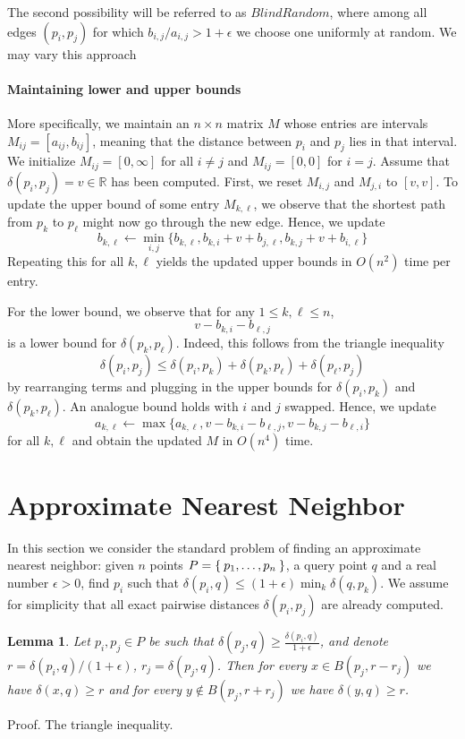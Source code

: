 \documentclass[10pt]{article}
\newcommand{\R}{\mathbb{R}}
\newcommand{\eps}{\epsilon}
\newcommand{\dist}{\delta}
\newtheorem{lemma}[theorem]{Lemma}
\begin{document}
The second possibility will be referred to as $BlindRandom$, where among all edges $(p_i, p_j)$
for which $b_{i,j} / a_{i,j} > 1 + \eps$ we choose one uniformly at random. We may vary this approach




 \paragraph{Maintaining lower and upper bounds}
 More specifically,
 we maintain an $n\times n$ matrix $M$ whose entries
are intervals $M_{ij}=[a_{ij},b_{ij}]$, meaning that the distance
between $p_i$ and $p_j$ lies in that interval. 
We initialize $M_{ij}=[0,\infty]$ for all $i\neq j$
and $M_{ij}=[0,0]$ for $i=j$.  Assume that $\dist(p_i,p_j)=v\in\R$ has been computed.
First, we reset $M_{i,j}$ and $M_{j,i}$ to $[v,v]$. 
To update the upper bound of some entry $M_{k,\ell}$,
we observe that the shortest path from $p_k$ to $p_\ell$ might now
go through the new edge. Hence, we update
%
\[b_{k,\ell}\gets \min_{i,j}\{b_{k,\ell},b_{k,i}+v+b_{j,\ell},b_{k,j}+v+b_{i,\ell}\}\]
%
Repeating this for all $k,\ell$ yields the updated upper bounds in $O(n^2)$
time per entry.

For the lower bound, we observe that for any $1\leq k,\ell\leq n$,
%
\[v-b_{k,i}-b_{\ell,j}\]
%
is a lower bound for $\dist(p_k,p_\ell)$. Indeed, this follows from
the triangle inequality
%
\[\dist(p_i,p_j)\leq \dist(p_i,p_k)+\dist(p_k,p_\ell)+\dist(p_\ell,p_j)\]
by rearranging terms and plugging in the upper bounds for $\dist(p_i,p_k)$
and $\dist(p_k,p_\ell)$. An analogue bound holds with $i$ and $j$ swapped. Hence, we update
%
\[a_{k,\ell}\gets \max\{a_{k,\ell},v-b_{k,i}-b_{\ell,j},v-b_{k,j}-b_{\ell,i}\}\]
%
for all $k,\ell$ and obtain the updated $M$ in $O(n^4)$ time.



\section{Approximate Nearest Neighbor}

In this section we consider the standard problem of finding an approximate nearest neighbor: given
$n$ points $P = \Set{p_1, \dots, p_n}$, a query point $q$ and a real number $\eps > 0$,
find $p_i$ such that $\dist(p_i, q) \leq (1 + \eps) \min_{k} \dist(q, p_k)$. We assume for simplicity
that all exact pairwise distances $\dist(p_i, p_j)$ are already computed. 


\begin{lemma}
    Let $p_i, p_j \in P$ be such that $\dist(p_j, q) \geq \frac{\dist(p_i, q)}{1 + \eps}$,
    and denote $r = \dist(p_i, q) / (1 + \eps)$, $r_j = \dist(p_j, q)$.
    Then for every $x \in B(p_j, r - r_j)$ we have $\dist(x, q) \geq r$
    and for every $y \notin B(p_j, r + r_j)$ we have $\dist(y, q) \geq r$.
\end{lemma}
Proof. The triangle inequality.
\end{document}
